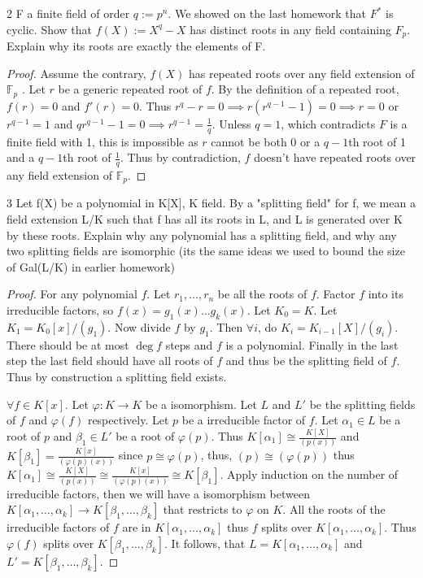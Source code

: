 \documentclass{article}
\newcommand{\F}{\mathbb{F}}
\begin{document}
\begin{PROB}{2}\label{Problem 2.}
    F a finite field of order $q := p^n$. We showed on the last homework that $F^*$ is cyclic. Show that $f(X) := X^q - X$ has distinct roots in any field containing $F_p$. Explain why its roots are exactly the elements of F. 
\end{PROB}
\begin{proof}
    Assume the contrary, $f(X)$ has repeated roots over any field extension of $\F_p$ . Let $r$ be a generic repeated root of $f$. By the definition of a repeated root, $f(r) = 0$ and $f'(r) = 0$. Thus $r^q - r = 0 \implies r(r^{q-1} - 1) = 0 \implies r = 0$ or $r^{q - 1} = 1$ and $qr^{q - 1} - 1 = 0 \implies r^{q - 1} = \frac{1}{q}$. Unless $q = 1$, which contradicts $F$ is a finite field with 1, this is impossible as $r$ cannot be both $0$ or a $q - 1$th root of 1 and a $q - 1$th root of $\frac{1}{q}$. Thus by contradiction, $f$ doesn't have repeated roots over any field extension of $\F_p$.  
\end{proof}

\bigskip

\begin{PROB}{3}\label{Problem 3.}
    Let f(X) be a polynomial in K[X], K field. By a "splitting field" for f, we mean a field extension L/K such that f has all its roots in L, and L is generated over K by these roots. Explain why any polynomial has a splitting field, and why any two splitting fields are isomorphic (its the same ideas we used to bound the size of Gal(L/K) in earlier homework)
\end{PROB}
\begin{proof}
    For any polynomial $f$. Let $r_1, \dots, r_n$ be all the roots of $f$. Factor $f$ into its irreducible factors, so $f(x) = g_1(x) \dots g_k(x)$. Let $K_0 = K$. Let $K_1 = K_0[x] / (g_1)$. Now divide $f$ by $g_1$. Then $\forall i$, do $K_i = K_{i - 1}[X] / (g_i)$. There should be at most $\deg f$ steps and $f$ is a polynomial. Finally in the last step the last field should have all roots of $f$ and thus be the splitting field of $f$. Thus by construction a splitting field exists.                 
    
    $\forall f \in K[x]$. Let $\varphi: K \to K$ be a isomorphism. Let $L$ and $L'$ be the splitting fields of $f$ and $\varphi(f)$ respectively. Let $p$ be a irreducible factor of $f$. Let $\alpha_1 \in L$ be a root of $p$ and $\beta_1 \in L'$ be a root of $\varphi(p)$. Thus $K[\alpha_1] \cong \frac{K[X]}{(p(x))}$ and $K[\beta_1] = \frac{K[x]}{(\varphi(p)(x))}$ since $p \cong \varphi(p)$, thus, $(p) \cong (\varphi(p))$ thus $K[\alpha_1] \cong \frac{K[X]}{(p(x))} \cong \frac{K[x]}{(\varphi(p)(x))} \cong K[\beta_1]$. Apply induction on the number of irreducible factors, then we will have a isomorphism between $K[\alpha_1, \dots, \alpha_k] \to K[\beta_1, \dots, \beta_k]$ that restricts to $\varphi$ on $K$. All the roots of the irreducible factors of $f$ are in $K[\alpha_1, \dots, \alpha_k]$ thus $f$ splits over $K[\alpha_1, \dots, \alpha_k]$. Thus $\varphi(f)$ splits over $K[\beta_1, \dots, \beta_k]$. It follows, that $L = K[\alpha_1, \dots, \alpha_k]$ and $L' = K[\beta_1, \dots, \beta_k]$.               
\end{proof}
\end{document}
